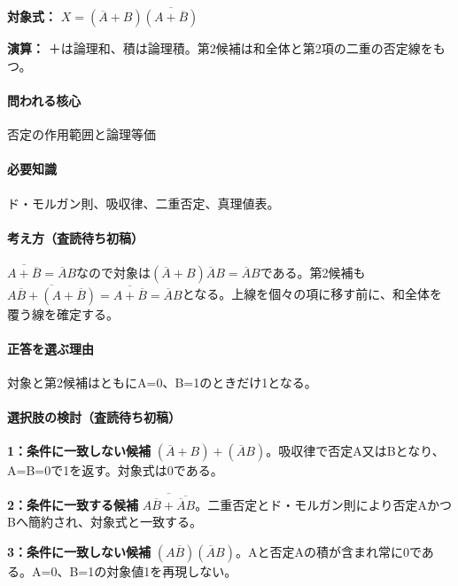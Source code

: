 \noindent\textbf{対象式：} \(X=(\overline A+B)\overline{(A+\overline B)}\)\par

\noindent\textbf{演算：} ＋は論理和、積は論理積。第2候補は和全体と第2項の二重の否定線をもつ。\par

\paragraph{問われる核心} 否定の作用範囲と論理等価

\paragraph{必要知識} ド・モルガン則、吸収律、二重否定、真理値表。

\paragraph{考え方（査読待ち初稿）} \(\overline{A+\overline B}=\overline A B\)なので対象は\((\overline A+B)\overline A B=\overline A B\)である。第2候補も\(\overline{A\overline B+(A+\overline B)}=\overline{A+\overline B}=\overline A B\)となる。上線を個々の項に移す前に、和全体を覆う線を確定する。

\paragraph{正答を選ぶ理由} 対象と第2候補はともにA=\allowbreak{}0、B=\allowbreak{}1のときだけ1となる。

\paragraph{選択肢の検討（査読待ち初稿）}\mbox{}\par

\noindent\textbf{1：条件に一致しない候補} \((\overline A+B)+(\overline A B)\)。吸収律で否定A又はBとなり、A=\allowbreak{}B=\allowbreak{}0で1を返す。対象式は0である。\par

\noindent\textbf{2：条件に一致する候補} \(\overline{A\overline B+\overline{\overline A B}}\)。二重否定とド・モルガン則により否定AかつBへ簡約され、対象式と一致する。\par

\noindent\textbf{3：条件に一致しない候補} \((A\overline B)(\overline A B)\)。Aと否定Aの積が含まれ常に0である。A=\allowbreak{}0、B=\allowbreak{}1の対象値1を再現しない。\par

